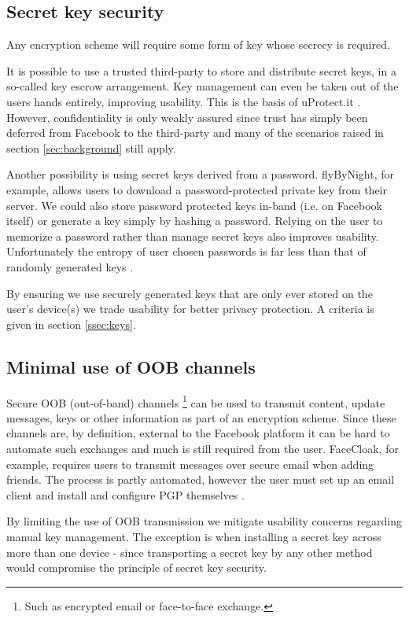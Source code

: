 \FloatBarrier
\subsection{Secret key security}

Any encryption scheme will require some form of key whose secrecy is required.

It is possible to use a trusted third-party to store and distribute secret keys, in a so-called key escrow arrangement. Key management can even be taken out of the users hands entirely, improving usability. This is the basis of uProtect.it \cite{uprotect}. However, confidentiality is only weakly assured since trust has simply been deferred from Facebook to the third-party and many of the scenarios raised in section \ref{sec:background} still apply.

Another possibility is using secret keys derived from a password. flyByNight, for example, allows users to download a password-protected private key from their server. We could also store password protected keys in-band (i.e. on Facebook itself) or generate a key simply by hashing a password. Relying on the user to memorize a password rather than manage secret keys also improves usability. Unfortunately the entropy of user chosen passwords is far less than that of randomly generated keys \cite{passwords}.

By ensuring we use securely generated keys that are only ever stored on the user's device(s) we trade usability for better privacy protection. A criteria is given in section \ref{ssec:keys}.


\FloatBarrier
\subsection{Minimal use of OOB channels}

Secure OOB (out-of-band) channels \footnote{Such as encrypted email or face-to-face exchange.} can be used to transmit content, update messages, keys or other information as part of an encryption scheme. Since these channels are, by definition, external to the Facebook platform it can be hard to automate such exchanges and much is still required from the user. FaceCloak, for example, requires users to transmit messages over secure email when adding friends. The process is partly automated, however the user must set up an email client and install and configure PGP themselves \cite{facecloak}.

By limiting the use of OOB transmission we mitigate usability concerns regarding manual key management. The exception is when installing a secret key across more than one device - since transporting a secret key by any other method would compromise the principle of secret key security.


